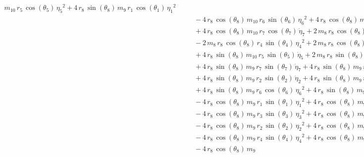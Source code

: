 \begin{eqnarray*}
m_{10}\,r_{5}\,\cos({\theta_{5}})\,{{\eta_{5}}}^2 + 4\,r_{8}\,\sin({
\theta_{8}})\,m_{9}\,r_{1}\,\cos({\theta_{1}})\,{{\eta_{1}}}^2
 \\ &&\quad\mbox{} - 4\,r_{8}\,\cos({\theta_{8}})\,m_{10}\,r_{6}\,\sin
({\theta_{6}})\,{{\eta_{6}}}^2 + 4\,r_{8}\,\cos({\theta_{8}})\,m_{10}
\,r_{6}\,\cos({\theta_{6}})\,{\dot{\eta}_{6}} \\ &&\quad\mbox{} + 4\,r
_{8}\,\cos({\theta_{8}})\,m_{10}\,r_{7}\,\cos({\theta_{7}})\,{
\dot{\eta}_{7}} + 2\,m_{8}\,r_{8}\,\cos({\theta_{8}})\,r_{2}\,\cos({
\theta_{2}})\,{\dot{\eta}_{2}} \\ &&\quad\mbox{} - 2\,m_{8}\,r_{8}\,
\cos({\theta_{8}})\,r_{4}\,\sin({\theta_{4}})\,{{\eta_{4}}}^2 + 2\,m_{
8}\,r_{8}\,\cos({\theta_{8}})\,r_{4}\,\cos({\theta_{4}})\,{\dot{\eta}
_{4}} \\ &&\quad\mbox{} + 4\,r_{8}\,\sin({\theta_{8}})\,m_{10}\,r_{5}
\,\sin({\theta_{5}})\,{\dot{\eta}_{5}} + 2\,m_{8}\,r_{8}\,\sin({\theta
_{8}})\,r_{5}\,\cos({\theta_{5}})\,{{\eta_{5}}}^2 \\ &&\quad\mbox{} + 
4\,r_{8}\,\sin({\theta_{8}})\,m_{9}\,r_{7}\,\sin({\theta_{7}})\,{
\dot{\eta}_{7}} + 4\,r_{8}\,\sin({\theta_{8}})\,m_{9}\,r_{2}\,\cos({
\theta_{2}})\,{{\eta_{2}}}^2 \\ &&\quad\mbox{} + 4\,r_{8}\,\sin({
\theta_{8}})\,m_{9}\,r_{2}\,\sin({\theta_{2}})\,{\dot{\eta}_{2}} + 4\,
r_{8}\,\sin({\theta_{8}})\,m_{9}\,r_{5}\,\cos({\theta_{5}})\,{{\eta_{5
}}}^2 \\ &&\quad\mbox{} + 4\,r_{8}\,\sin({\theta_{8}})\,m_{9}\,r_{6}\,
\cos({\theta_{6}})\,{{\eta_{6}}}^2 + 4\,r_{8}\,\sin({\theta_{8}})\,m_{
9}\,r_{6}\,\sin({\theta_{6}})\,{\dot{\eta}_{6}} \\ &&\quad\mbox{} - 4
\,r_{8}\,\cos({\theta_{8}})\,m_{9}\,r_{1}\,\sin({\theta_{1}})\,{{\eta
_{1}}}^2 + 4\,r_{8}\,\cos({\theta_{8}})\,m_{9}\,r_{1}\,\cos({\theta_{1
}})\,{\dot{\eta}_{1}} \\ &&\quad\mbox{} - 4\,r_{8}\,\cos({\theta_{8}})
\,m_{9}\,r_{3}\,\sin({\theta_{3}})\,{{\eta_{3}}}^2 + 4\,r_{8}\,\cos({
\theta_{8}})\,m_{9}\,r_{3}\,\cos({\theta_{3}})\,{\dot{\eta}_{3}}
 \\ &&\quad\mbox{} - 4\,r_{8}\,\cos({\theta_{8}})\,m_{9}\,r_{2}\,\sin(
{\theta_{2}})\,{{\eta_{2}}}^2 + 4\,r_{8}\,\cos({\theta_{8}})\,m_{9}\,r
_{2}\,\cos({\theta_{2}})\,{\dot{\eta}_{2}} \\ &&\quad\mbox{} - 4\,r_{8
}\,\cos({\theta_{8}})\,m_{9}\,r_{4}\,\sin({\theta_{4}})\,{{\eta_{4}}}^
2 + 4\,r_{8}\,\cos({\theta_{8}})\,m_{9}\,r_{4}\,\cos({\theta_{4}})\,{
\dot{\eta}_{4}} \\ &&\quad\mbox{} - 4\,r_{8}\,\cos({\theta_{8}})\,m_{9
}
\end{eqnarray*}
